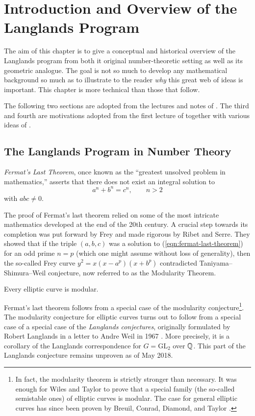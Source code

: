 \chapter{Introduction and Overview of the Langlands Program\label{ch:intro}}

The aim of this chapter is to give a conceptual and historical overview of the Langlands program from both it original number-theoretic setting as well as its geometric analogue. The goal is not so much to develop any mathematical background so much as to illustrate to the reader \emph{why} this great web of ideas is important. This chapter is more technical than those that follow.

The following two sections are adopted from the lectures and notes of \cite{Yoo18}. The third and fourth are motivations adopted from the first lecture of \cite{Yoo17} together with various ideas of \cite{Yoo18}.

\section{The Langlands Program in Number Theory} %
\label{sec:the_langlands_program_in_number_theory}

\emph{Fermat's Last Theorem}, once known as the ``greatest unsolved problem in mathematics,'' asserts that there does not exist an integral solution to
\begin{equation}
\label{eqn:fermat-last-theorem}
a^n + b^n = c^n, \qquad n > 2
\end{equation}
with $abc\neq 0$. 

The proof of Fermat's last theorem relied on some of the most intricate mathematics developed at the end of the 20th century. A crucial step towards its completion was put forward by Frey and made rigorous by Ribet and Serre. They showed that if the triple $(a,b,c)$ was a solution to (\ref{eqn:fermat-last-theorem}) for an odd prime $n=p$ (which one might assume without loss of generality), then the so-called Frey curve $y^2=x(x-a^p)(x+b^p)$ contradicted Taniyama--Shimura--Weil conjecture, now referred to as the Modularity Theorem. 
\begin{theorem}
\label{thm:modularity-theorem}
	Every elliptic curve is modular.
\end{theorem}

Fermat's last theorem follows from a special case of the modularity conjecture\footnote{In fact, the modularity theorem is strictly stronger than necessary. It was enough for Wiles and Taylor to prove that a special family (the so-called semistable ones) of elliptic curves is modular. The case for general elliptic curves has since been proven by Breuil, Conrad, Diamond, and Taylor \cite{breuil2001}.}. The modularity conjecture for elliptic curves turns out to follow from a special case of a special case of the \emph{Langlands conjectures}, originally formulated by Robert Langlands in a letter to Andre Weil in 1967 \cite{langlands1967}.
More precisely, it is a corollary of the Langlands correspondence for $G = \mathrm{GL}_2$ over $\mathbb{Q}$. This part of the Langlands conjecture remains unproven as of May 2018. 

